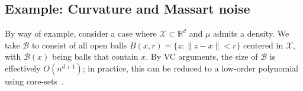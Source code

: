 \documentclass[twoside]{article}
\def\R{{\mathbb{R}}}
\def\X{{\mathcal X}}
\def\B{{\mathcal B}}
\begin{document}


\subsection{Example: Curvature and Massart noise}
\label{sec:Massart}

By way of example, consider a case where $\X \subset \R^d$ and $\mu$ admits a density. We take $\B$ to consist of all open balls $B(x,r) = \{z: \|z-x\| < r\}$ centered in $\X$, with $\B(x)$ being balls that contain $x$. By VC arguments, the size of $\B$ is effectively $O(n^{d+1})$; in practice, this can be reduced to a low-order polynomial using core-sets~\cite{BC03}.
\end{document}
